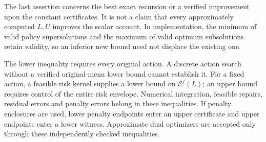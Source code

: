 The last assertion concerns the best exact recursion or a verified improvement upon the constant certificates. It is not a claim that every approximately computed $L,U$ improves the scalar account. In implementation, the minimum of valid policy supersolutions and the maximum of valid optimum subsolutions retain validity, so an inferior new bound need not displace the existing one.

The lower inequality requires every original action. A discrete action search without a verified original-menu lower bound cannot establish it. For a fixed action, a feasible risk kernel supplies a lower bound on $\mathcal E^f(L)$; an upper bound requires control of the entire risk envelope. Numerical integration, feasible repairs, residual errors and penalty errors belong in these inequalities. If penalty enclosures are used, lower penalty endpoints enter an upper certificate and upper endpoints enter a lower witness. Approximate dual optimizers are accepted only through these independently checked inequalities.

